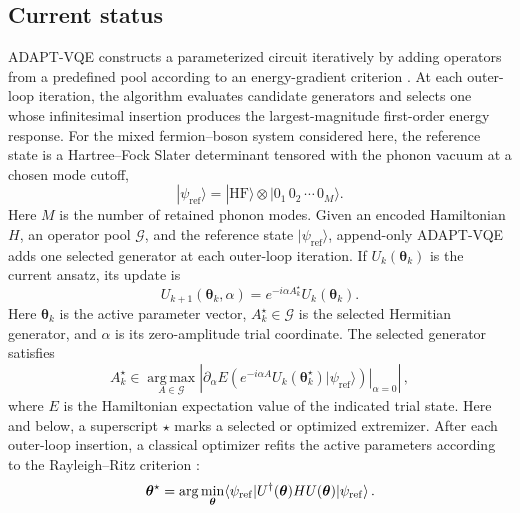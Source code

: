 \documentclass[
  reprint,
  amsmath,
  amssymb,
  aps,
  pra,
  nofootinbib,
  superscriptaddress,
  floatfix
]{revtex4-2}
\newcommand{\ket}[1]{|#1\rangle}
\newcommand{\bra}[1]{\langle #1|}
\begin{document}
\subsection{Current status}
ADAPT-VQE constructs a parameterized circuit iteratively by adding operators from a predefined pool according to an energy-gradient criterion \cite{Grimsley2019,Tang2021,Yordanov2021}.
At each outer-loop iteration, the algorithm evaluates candidate generators and selects one whose infinitesimal insertion produces the largest-magnitude first-order energy response. For the mixed fermion--boson system considered here, the reference state is a Hartree--Fock Slater determinant tensored with the phonon vacuum at a chosen mode cutoff,
\begin{equation*}
\ket{\psi_{\mathrm{ref}}}=\ket{\mathrm{HF}}\otimes\ket{0_1\,0_2\,\cdots\,0_M}.
\end{equation*}
Here \(M\) is the number of retained phonon modes. Given an encoded Hamiltonian \(H\), an operator pool \(\mathcal G\), and the reference state \(\ket{\psi_{\mathrm{ref}}}\), append-only ADAPT-VQE adds one selected generator at each outer-loop iteration. If \(U_k(\boldsymbol{\theta}_k)\) is the current ansatz, its update is
\begin{equation*}
U_{k+1}(\boldsymbol{\theta}_{k},\alpha)
=e^{-i\alpha A_k^\star}U_k(\boldsymbol{\theta}_{k}).
\end{equation*}
Here \(\boldsymbol{\theta}_k\) is the active parameter vector, \(A_k^\star\in\mathcal G\) is the selected Hermitian generator, and \(\alpha\) is its zero-amplitude trial coordinate. The selected generator satisfies
\begin{equation}
A_k^\star\in\operatorname*{arg\,max}_{A\in\mathcal G}
\left|
\left.
\partial_{\alpha}E\!\left(e^{-i\alpha A}U_k(\boldsymbol{\theta}_{k}^\star)\ket{\psi_{\mathrm{ref}}}\right)
\right|_{\alpha=0}
\right|\,,
\label{eq:adapt_append_gradient}
\end{equation}
where \(E\) is the Hamiltonian expectation value of the indicated trial state. Here and below, a superscript \(\star\) marks a selected or optimized extremizer. After each outer-loop insertion, a classical optimizer refits the active parameters according to the Rayleigh--Ritz criterion \cite{Peruzzo2014,McClean2016,Kandala2017}:
\begin{equation}
\label{eq:theta_opt}
\boldsymbol{\theta}^\star
=\arg\min_{\boldsymbol{\theta}}
\bra{\psi_{\rm ref}}U^\dagger(\boldsymbol{\theta})HU(\boldsymbol{\theta})
\ket{\psi_{\rm ref}}\,.
\end{equation}
\end{document}

